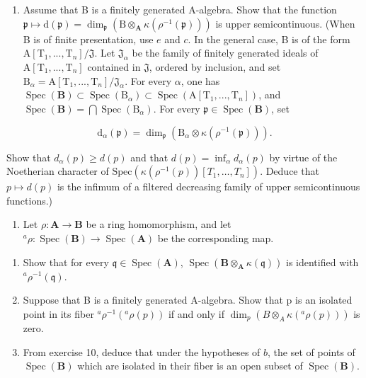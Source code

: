\begin{enumerate}
\def\labelenumi{\alph{enumi})}
\setcounter{enumi}{5}
\tightlist
\item
  Assume that B is a finitely generated A-algebra. Show that the function \(\mathfrak{p} \mapsto \mathrm{d}(\mathfrak{p}) = \dim_{\mathfrak{p}} (\mathrm{B} \otimes_{\mathbf{A}} \kappa(\rho^{-1}(\mathfrak{p})))\) is upper semicontinuous. (When B is of finite presentation, use \(e\) and \(c\). In the general case, B is of the form \(\mathrm{A}[\mathrm{T}_1, ..., \mathrm{T}_n]/\mathfrak{J}\). Let \(\mathfrak{J}_{\alpha}\) be the family of finitely generated ideals of \(\mathrm{A}[\mathrm{T}_1, ..., \mathrm{T}_n]\) contained in \(\mathfrak{J}\), ordered by inclusion, and set \(\mathrm{B}_{\alpha} = \mathrm{A}[\mathrm{T}_1, ..., \mathrm{T}_n]/\mathfrak{J}_{\alpha}\). For every \(\alpha\), one has \(\operatorname{Spec}(\mathbf{B}) \subset \operatorname{Spec}(\mathrm{B}_{\alpha}) \subset \operatorname{Spec}(\mathrm{A}[\mathrm{T}_1, ..., \mathrm{T}_n])\), and \(\operatorname{Spec}(\mathbf{B}) = \bigcap \operatorname{Spec}(\mathrm{B}_{\alpha})\). For every \(\mathfrak{p} \in \operatorname{Spec}(\mathbf{B})\), set
\end{enumerate}

\[
\mathrm{d} _ {\alpha} (\mathfrak {p}) = \dim_ {\mathfrak {p}} \left(\mathrm{B} _ {\alpha} \otimes \kappa \left(\rho^ {- 1} (\mathfrak {p})\right)\right).
\]

Show that \(d_{\alpha}(p) \geqslant d(p)\) and that \(d(p) = \inf_{\alpha} d_{\alpha}(p)\) by virtue of the Noetherian character of \(\text{Spec}(\kappa(\rho^{-1}(p))[T_1, \ldots, T_n])\). Deduce that \(p \mapsto d(p)\) is the infimum of a filtered decreasing family of upper semicontinuous functions.)

\begin{enumerate}
\def\labelenumi{\arabic{enumi})}
\setcounter{enumi}{10}
\tightlist
\item
  Let \(\rho: \mathbf{A} \to \mathbf{B}\) be a ring homomorphism, and let \(^a\rho: \operatorname{Spec}(\mathbf{B}) \to \operatorname{Spec}(\mathbf{A})\) be the corresponding map.
\end{enumerate}

\begin{enumerate}
\def\labelenumi{\alph{enumi})}
\item
  Show that for every \(\mathfrak{q} \in \operatorname{Spec}(\mathbf{A})\), \(\operatorname{Spec}(\mathbf{B} \otimes_{\mathbf{A}} \kappa(\mathfrak{q}))\) is identified with \(^a\rho^{-1}(\mathfrak{q})\).
\item
  Suppose that B is a finitely generated A-algebra. Show that p is an isolated point in its fiber \(^a\rho^{-1}(^a\rho(p))\) if and only if \(\dim_p(B \otimes_A \kappa(^a\rho(p)))\) is zero.
\item
  From exercise 10, deduce that under the hypotheses of \(b\), the set of points of \(\operatorname{Spec}(\mathbf{B})\) which are isolated in their fiber is an open subset of \(\operatorname{Spec}(\mathbf{B})\).
\end{enumerate}

